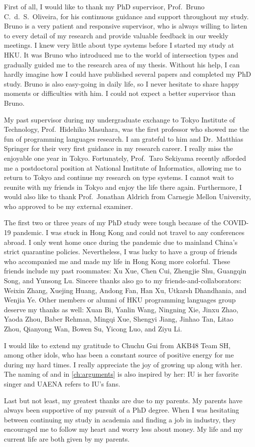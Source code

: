 First of all, I would like to thank my PhD supervisor, Prof.\ Bruno C.\ d.\ S.\
Oliveira, for his continuous guidance and support throughout my study. Bruno is
a very patient and responsive supervisor, who is always willing to listen to
every detail of my research and provide valuable feedback in our weekly
meetings. I knew very little about type systems before I started my study at
HKU. It was Bruno who introduced me to the world of intersection types and
gradually guided me to the research area of my thesis. Without his help, I can
hardly imagine how I could have published several papers and completed my PhD
study. Bruno is also easy-going in daily life, so I never hesitate to share
happy moments or difficulties with him. I could not expect a better supervisor
than Bruno.

My past supervisor during my undergraduate exchange to Tokyo Institute of
Technology, Prof.\ Hidehiko Masuhara, was the first professor who showed me the
fun of programming languages research. I am grateful to him and Dr.\ Matthias
Springer for their very first guidance in my research career. I really miss the
enjoyable one year in Tokyo. Fortunately, Prof.\ Taro Sekiyama recently afforded
me a postdoctoral position at National Institute of Informatics, allowing me to
return to Tokyo and continue my research on type systems. I cannot wait to
reunite with my friends in Tokyo and enjoy the life there again. Furthermore, I
would also like to thank Prof.\ Jonathan Aldrich from Carnegie Mellon University,
who approved to be my external examiner.

The first two or three years of my PhD study were tough because of the COVID-19
pandemic. I was stuck in Hong Kong and could not travel to any conferences
abroad. I only went home once during the pandemic due to mainland China's
strict quarantine policies. Nevertheless, I was lucky to have a group of friends
who accompanied me and made my life in Hong Kong more colorful. These friends
include my past roommates: Xu Xue, Chen Cui, Zhengjie Shu, Guangqin Song, and
Yunsong Lu. Sincere thanks also go to my friends-and-collaborators: Weixin
Zhang, Xuejing Huang, Andong Fan, Han Xu, Utkarsh Dhandhania, and Wenjia Ye.
Other members or alumni of HKU programming languages group deserve my thanks as
well: Xuan Bi, Yanlin Wang, Ningning Xie, Jinxu Zhao, Yaoda Zhou, Baber Rehman,
Mingqi Xue, Shengyi Jiang, Jinhao Tan, Litao Zhou, Qianyong Wan, Bowen Su,
Yicong Luo, and Ziyu Li.

I would like to extend my gratitude to Chuchu Gui from AKB48 Team SH, among
other idols, who has been a constant source of positive energy for me during my
hard times. I really appreciate the joy of growing up along with her. The naming
of \lambdaiu and \uaena in \autoref{ch:arguments} is also inspired by her: IU is
her favorite singer and UAENA refers to IU's fans.

Last but not least, my greatest thanks are due to my parents. My parents have
always been supportive of my pursuit of a PhD degree. When I was hesitating
between continuing my study in academia and finding a job in industry, they
encouraged me to follow my heart and worry less about money. My life and my
current life are both given by my parents.
